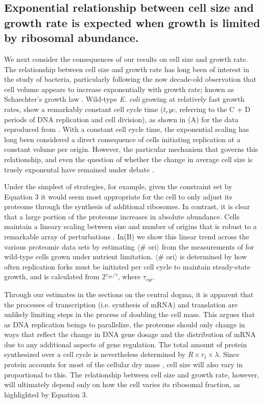 \subsection{Exponential relationship between cell size and growth rate is
expected when growth is limited by ribosomal abundance.}

We next consider the consequences of our results on
cell size and growth rate. The relationship between cell size and growth rate
has long been of interest in the study of bacteria, particularly following the
now decade-old observation that cell volume appears to increase exponentially
with growth rate; known as Schaechter's growth law  \citep{schaechter1958,
taheriaraghi2015}. Wild-type \textit{E. coli} growing at relatively fast growth
rates, show a remarkably constant cell cycle time ($t_cyc$, referring to the C +
D periods of DNA replication and cell division), as shown in (A) for the
data reproduced from \citep{si2017}. With a constant cell cycle time, the
exponential scaling has long been considered a direct consequence of cells
initiating replication at a constant volume per origin. However, the particular
mechanism that governs this relationship, and even the question of whether the
change in average cell size is truely exponental have remained under
debate \citep{si2017, harris2018}.

Under the simplest of strategies, for example, given the constraint set by
Equation 3 it would seem most appropriate for the cell to only adjust its
proteome through the synthesis of additional ribosomes. In contrast, it is clear
that a large portion of the proteome increases in absolute abundance. Cells
maintain a lineary scaling between size and number of origins that is robust to
a remarkable array of perturbations \citep{si2017}.  In(B) we show this
linear trend across the various proteomic data sets by estimating $\langle$\#
ori$\rangle$ from the measurements of \cite{si2017} for wild-type cells grown
under nutrient limitation. $\langle$\# ori$\rangle$ is determined by how often
replication forks must be initiated per cell cycle to maintain steady-state
growth, and is calculated from  2$^{\tau_{cyc} / \tau}$, where $\tau_{cyc}$.

Through our estimates in the sections on the central dogma, it is
apparent that the processes of transcription (i.e. synthesis of mRNA) and
translation are unlikely limiting steps in the process of doubling the
cell mass. This argues that as DNA replication beings to parallelize, the
proteome should only change in ways that reflect the change in DNA gene dosage
and the distribution of mRNA due to any additional aspects of gene regulation.
The total amount of protein synthesized over a cell cycle is nevertheless
determined by $R \times r_t \times \lambda$. Since protein accounts for most of
the cellular dry mass \citep{bremer2008, basan2015}, cell size will also vary
in proportional to this. The relationship between cell size and growth rate,
however, will ultimately depend only on how the cell varies its ribosomal
fraction, as highlighted by Equation 3.

